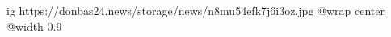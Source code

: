  
 
 
 
 

\ifcmt
  ig https://donbas24.news/storage/news/n8mu54efk7j6i3oz.jpg
  @wrap center
  @width 0.9
\fi
